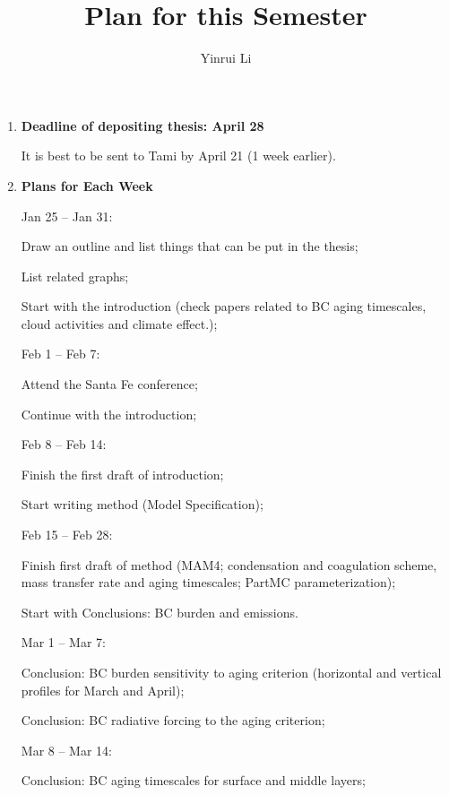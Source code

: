 \documentclass[11pt]{article}
\title{\textbf{Plan for this Semester}}
\author{Yinrui Li}
\date{}
\begin{document}
	\maketitle
	
	\begin{enumerate}
		\item \textbf{Deadline of depositing thesis: April 28} 
		
		It is best to be sent to Tami by April 21 (1 week earlier).
		
		\item \textbf{Plans for Each Week}
		
		Jan 25 -- Jan 31: 
		
		Draw an outline and list things that can be put in the thesis;
		
		List related graphs;
		
		Start with the introduction (check papers related to BC aging timescales, cloud activities and climate effect.);
		
		\bigskip
		
		Feb 1 -- Feb 7:
		
		Attend the Santa Fe conference;
		
		Continue with the introduction; 
		
		\bigskip
		
		Feb 8 -- Feb 14:
		
		Finish the first draft of introduction;
		
		Start writing method (Model Specification);
		
		\bigskip
		
		Feb 15 -- Feb 28:
		
		Finish first draft of method (MAM4; condensation and coagulation scheme, mass transfer rate and aging timescales; PartMC parameterization);
		
		Start with Conclusions: BC burden and emissions.
		
		\bigskip
		
		Mar 1 -- Mar 7:		
		
		Conclusion: BC burden sensitivity to aging criterion (horizontal and vertical profiles for March and April);
		
		Conclusion: BC radiative forcing to the aging criterion;
		
		\bigskip
		
		Mar 8 -- Mar 14:
		
		Conclusion: BC aging timescales for surface and middle layers;
		

\end{enumerate}
\end{document}
